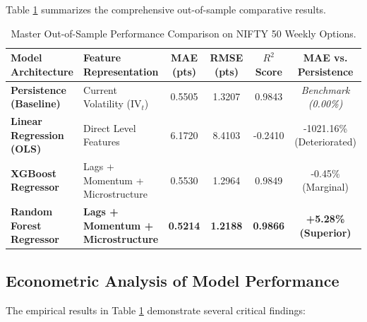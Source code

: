 Table \ref{tab:master_model_performance} summarizes the comprehensive out-of-sample comparative results.

\begin{table}[H]
    \centering
    \scriptsize
    \renewcommand{\arraystretch}{0.90}
    \caption{Master Out-of-Sample Performance Comparison on NIFTY 50 Weekly Options.}
    \label{tab:master_model_performance}
    \begin{tabularx}{\textwidth}{lXcccc}
        \toprule
        \textbf{Model Architecture} & \textbf{Feature Representation} & \textbf{MAE (pts)} & \textbf{RMSE (pts)} & \textbf{$R^2$ Score} & \textbf{MAE vs. Persistence} \\
        \midrule
        \textbf{Persistence (Baseline)} & Current Volatility ($\text{IV}_t$) & 0.5505 & 1.3207 & 0.9843 & \textit{Benchmark (0.00\%)} \\
        \textbf{Linear Regression (OLS)} & Direct Level Features & 6.1720 & 8.4103 & -0.2410 & -1021.16\% (Deteriorated) \\
        \textbf{XGBoost Regressor} & Lags + Momentum + Microstructure & 0.5530 & 1.2964 & 0.9849 & -0.45\% (Marginal) \\
        \textbf{Random Forest Regressor} & \textbf{Lags + Momentum + Microstructure} & \textbf{0.5214} & \textbf{1.2188} & \textbf{0.9866} & \textbf{+5.28\% (Superior)} \\
        \bottomrule
    \end{tabularx}
\end{table}

\subsection{Econometric Analysis of Model Performance}
The empirical results in Table \ref{tab:master_model_performance} demonstrate several critical findings:

